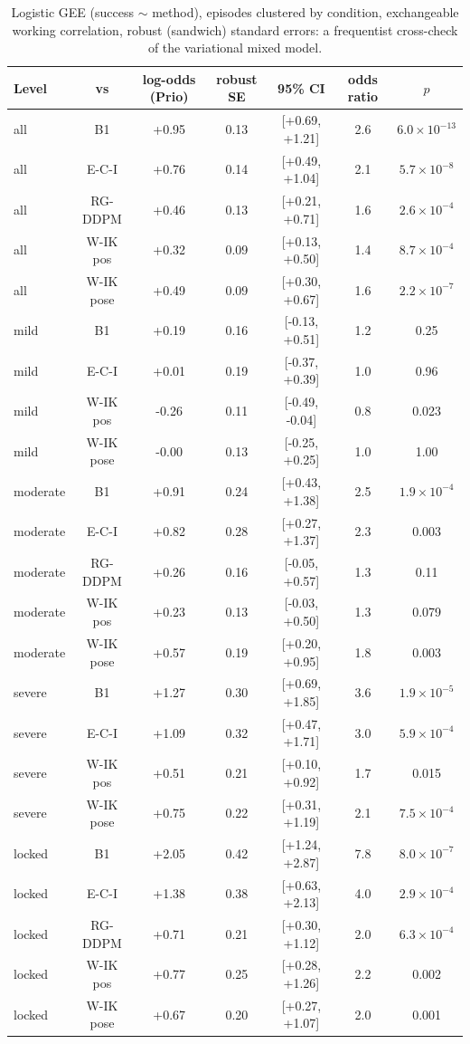 \begin{table}[t]
\centering
\caption{Logistic GEE (success $\sim$ method), episodes clustered by condition, exchangeable working correlation, robust (sandwich) standard errors: a frequentist cross-check of the variational mixed model.}
\label{tab:gee}
\setlength{\tabcolsep}{3pt}
\begin{tabular}{lcccccc}
\toprule
Level & vs & log-odds (Prio) & robust SE & 95\% CI & odds ratio & $p$ \\
\midrule
all & B1 & +0.95 & 0.13 & [+0.69, +1.21] & 2.6 & $6.0\times10^{-13}$ \\
all & E-C-I & +0.76 & 0.14 & [+0.49, +1.04] & 2.1 & $5.7\times10^{-8}$ \\
all & RG-DDPM & +0.46 & 0.13 & [+0.21, +0.71] & 1.6 & $2.6\times10^{-4}$ \\
all & W-IK pos & +0.32 & 0.09 & [+0.13, +0.50] & 1.4 & $8.7\times10^{-4}$ \\
all & W-IK pose & +0.49 & 0.09 & [+0.30, +0.67] & 1.6 & $2.2\times10^{-7}$ \\
mild & B1 & +0.19 & 0.16 & [-0.13, +0.51] & 1.2 & 0.25 \\
mild & E-C-I & +0.01 & 0.19 & [-0.37, +0.39] & 1.0 & 0.96 \\
mild & W-IK pos & -0.26 & 0.11 & [-0.49, -0.04] & 0.8 & 0.023 \\
mild & W-IK pose & -0.00 & 0.13 & [-0.25, +0.25] & 1.0 & 1.00 \\
moderate & B1 & +0.91 & 0.24 & [+0.43, +1.38] & 2.5 & $1.9\times10^{-4}$ \\
moderate & E-C-I & +0.82 & 0.28 & [+0.27, +1.37] & 2.3 & 0.003 \\
moderate & RG-DDPM & +0.26 & 0.16 & [-0.05, +0.57] & 1.3 & 0.11 \\
moderate & W-IK pos & +0.23 & 0.13 & [-0.03, +0.50] & 1.3 & 0.079 \\
moderate & W-IK pose & +0.57 & 0.19 & [+0.20, +0.95] & 1.8 & 0.003 \\
severe & B1 & +1.27 & 0.30 & [+0.69, +1.85] & 3.6 & $1.9\times10^{-5}$ \\
severe & E-C-I & +1.09 & 0.32 & [+0.47, +1.71] & 3.0 & $5.9\times10^{-4}$ \\
severe & W-IK pos & +0.51 & 0.21 & [+0.10, +0.92] & 1.7 & 0.015 \\
severe & W-IK pose & +0.75 & 0.22 & [+0.31, +1.19] & 2.1 & $7.5\times10^{-4}$ \\
locked & B1 & +2.05 & 0.42 & [+1.24, +2.87] & 7.8 & $8.0\times10^{-7}$ \\
locked & E-C-I & +1.38 & 0.38 & [+0.63, +2.13] & 4.0 & $2.9\times10^{-4}$ \\
locked & RG-DDPM & +0.71 & 0.21 & [+0.30, +1.12] & 2.0 & $6.3\times10^{-4}$ \\
locked & W-IK pos & +0.77 & 0.25 & [+0.28, +1.26] & 2.2 & 0.002 \\
locked & W-IK pose & +0.67 & 0.20 & [+0.27, +1.07] & 2.0 & 0.001 \\
\bottomrule
\end{tabular}
\end{table}
